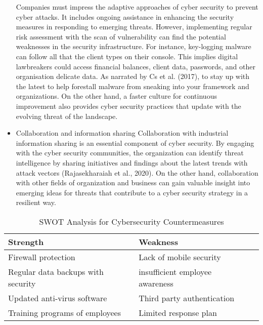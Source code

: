 \begin{itemize}
Companies must impress the adaptive approaches of cyber security to prevent cyber attacks. It includes ongoing assistance in enhancing the security measures in responding to emerging threats. However, implementing regular risk assessment with the scan of vulnerability can find the potential weaknesses in the security infrastructure. For instance, key-logging malware can follow all that the client types on their console. This implies digital lawbreakers could access financial balances, client data, passwords, and other organisation delicate data. As narrated by Cs et al. (2017), to stay up with the latest to help forestall malware from sneaking into your framework and organizations. On the other hand, a faster culture for continuous improvement also provides cyber security practices that update with the evolving threat of the landscape. 
    \item Collaboration and information sharing
Collaboration with industrial information sharing is an essential component of cyber security. By engaging with the cyber security communities, the organization can identify threat intelligence by sharing initiatives and findings about the latest trends with attack vectors (Rajasekharaiah et al., 2020). On the other hand, collaboration with other fields of organization and business can gain valuable insight into emerging ideas for threats that contribute to a cyber security strategy in a resilient way. 

\end{itemize}

\begin{table}[h!]
    \centering
    \caption{SWOT Analysis for Cybersecurity Countermeasures}
    \label{tab:_ex_tab}
    \begin{tabular}{llr}     
    \toprule
    \cmidrule(r){1-2}
    Strength    &  Weakness   \\
    \midrule
    Firewall protection                &Lack of mobile security   \\
    Regular data backups with security & insufficient employee      awareness \\
    Updated anti-virus software        &Third party authentication \\
    Training programs of employees     &Limited response plan      \\
        \bottomrule
    \end{tabular}
\end{table}

